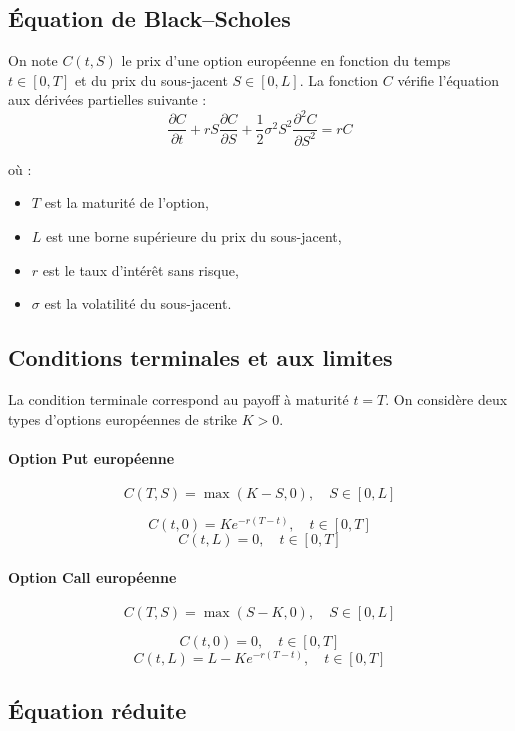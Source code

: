 \documentclass[12pt,a4paper]{article}
\begin{document}
\subsection{Équation de Black--Scholes}

On note $C(t,S)$ le prix d’une option européenne en fonction du temps
$t \in [0,T]$ et du prix du sous-jacent $S \in [0,L]$. La fonction $C$ vérifie
l’équation aux dérivées partielles suivante :
\begin{equation}
\frac{\partial C}{\partial t}
+ rS \frac{\partial C}{\partial S}
+ \frac{1}{2}\sigma^2 S^2 \frac{\partial^2 C}{\partial S^2}
= rC
\end{equation}

où :
\begin{itemize}
\item $T$ est la maturité de l’option,
\item $L$ est une borne supérieure du prix du sous-jacent,
\item $r$ est le taux d’intérêt sans risque,
\item $\sigma$ est la volatilité du sous-jacent.
\end{itemize}

\subsection{Conditions terminales et aux limites}

La condition terminale correspond au payoff à maturité $t=T$. On considère deux
types d’options européennes de strike $K>0$.

\paragraph{Option Put européenne}

\[
C(T,S) = \max(K-S,0), \quad S \in [0,L]
\]

\[
C(t,0) = K e^{-r(T-t)}, \quad t \in [0,T]
\]
\[
C(t,L) = 0, \quad t \in [0,T]
\]

\paragraph{Option Call européenne}

\[
C(T,S) = \max(S-K,0), \quad S \in [0,L]
\]

\[
C(t,0) = 0, \quad t \in [0,T]
\]
\[
C(t,L) = L - K e^{-r(T-t)}, \quad t \in [0,T]
\]
\subsection{Équation réduite}
\end{document}

